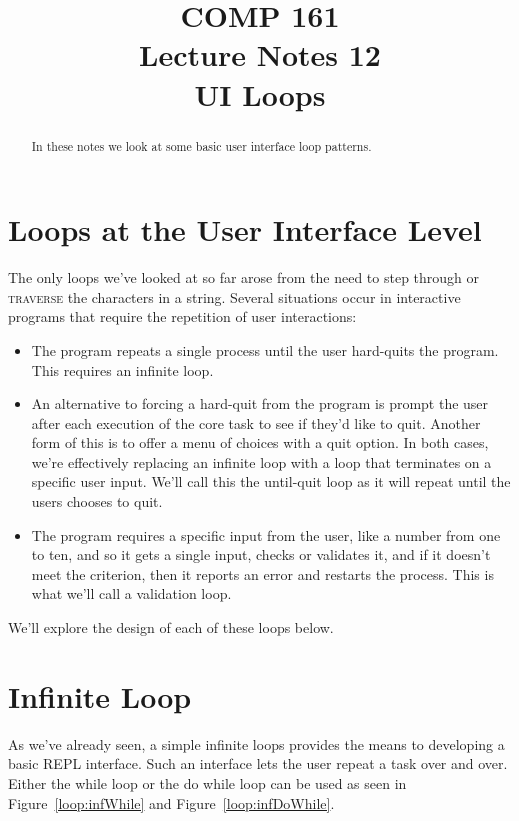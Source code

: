 \documentclass[]{tufte-handout}
\title{COMP 161 \\ Lecture Notes 12 \\ UI Loops}
\begin{document}
\maketitle

\begin{abstract}
In these notes we look at some basic user interface loop patterns.
\end{abstract}

\section{Loops at the User Interface Level}

The only loops we've looked at so far arose from the need to step through or \textsc{traverse} the characters in a string.  Several situations occur in interactive programs that require the repetition of user interactions:
\begin{itemize}
	\item The program repeats a single process until the user hard-quits the program.  This requires an infinite loop.
	\item An alternative to forcing a hard-quit from the program is prompt the user after each execution of the core task to see if they'd like to quit. Another form of this is to offer a menu of choices with a quit option. In both cases, we're effectively replacing an infinite loop with a loop that terminates on a specific user input. We'll call this the until-quit loop as it will repeat until the users chooses to quit.
	\item The program requires a specific input from the user, like a number from one to ten, and so it gets a single input, checks or validates it, and if it doesn't meet the criterion, then it reports an error and restarts the process. This is what we'll call a validation loop.
\end{itemize}

We'll explore the design of each of these loops below.

\section{Infinite Loop}

As we've already seen, a simple infinite loops provides the means to developing a basic REPL interface. Such an interface lets the user repeat a task over and over.  Either the while loop or the do while loop can be used as seen in Figure~\ref{loop:infWhile} and Figure~\ref{loop:infDoWhile}.
\end{document}
